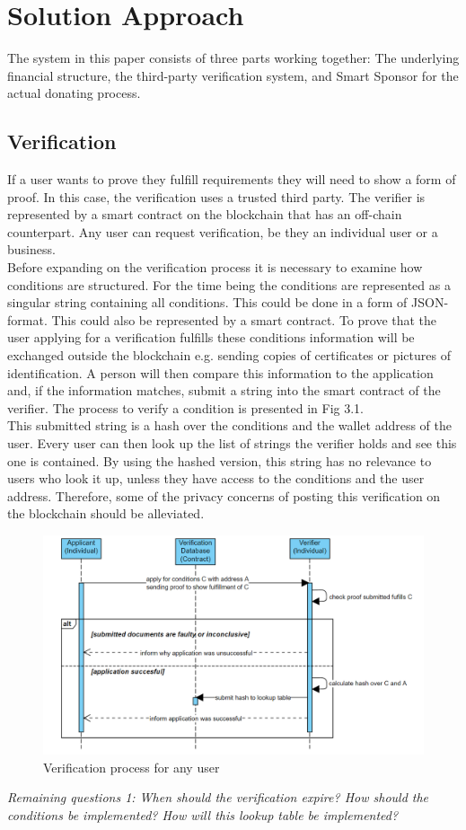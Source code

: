 \chapter{Solution Approach}
The system in this paper consists of three parts working together: The underlying financial structure, the third-party verification system, and Smart Sponsor for the actual donating process.
\section*{Verification}
If a user wants to prove they fulfill requirements they will need to show a form of proof. In this case, the verification uses a trusted third party. The verifier is represented by a smart contract on the blockchain that has an off-chain counterpart. Any user can request verification, be they an individual user or a business. \\
Before expanding on the verification process it is necessary to examine how conditions are structured. For the time being the conditions are represented as a singular string containing all conditions. This could be done in a form of JSON-format. This could also be represented by a smart contract. To prove that the user applying for a verification fulfills these conditions information will be exchanged outside the blockchain e.g. sending copies of certificates or pictures of identification. A person will then compare this information to the application and, if the information matches, submit a string into the smart contract of the verifier. The process to verify a condition is presented in Fig 3.1.\\
This submitted string is a hash over the conditions and the wallet address of the user. Every user can then look up the list of strings the verifier holds and see this one is contained. By using the hashed version, this string has no relevance to users who look it up, unless they have access to the conditions and the user address. Therefore, some of the privacy concerns of posting this verification on the blockchain should be alleviated.\\
\begin{figure}[H]
    \centering
    \includegraphics[scale=0.45]{figures/verification.PNG}  
    \caption{Verification process for any user}
    \label{fig:verifyModel}
\end{figure}
\emph{Remaining questions 1: When should the verification expire? How should the conditions be implemented? How will this lookup table be implemented?}
